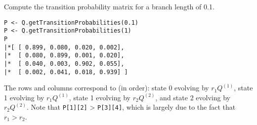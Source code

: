 Compute the transition probability matrix for a branch length of 0.1.

{\tt \begin{snugshade*}
\begin{lstlisting}
P <- Q.getTransitionProbabilities(0.1)
P <- Q.getTransitionProbabilities(1)
P
|*[ [ 0.899, 0.080, 0.020, 0.002],
|*  [ 0.080, 0.899, 0.001, 0.020],
|*  [ 0.040, 0.003, 0.902, 0.055],
|*  [ 0.002, 0.041, 0.018, 0.939] ]
\end{lstlisting}
\end{snugshade*}}

The rows and columns correspond to (in order): state 0 evolving by $r_1 Q^{(1)}$, state 1 evolving by $r_1 Q^{(1)}$, state 1 evolving by $r_2 Q^{(2)}$, and state 2 evolving by $r_2 Q^{(2)}$.
Note that {\tt P[1][2]} > {\tt P[3][4]}, which is largely due to the fact that $r_1 > r_2$.

\newpage
